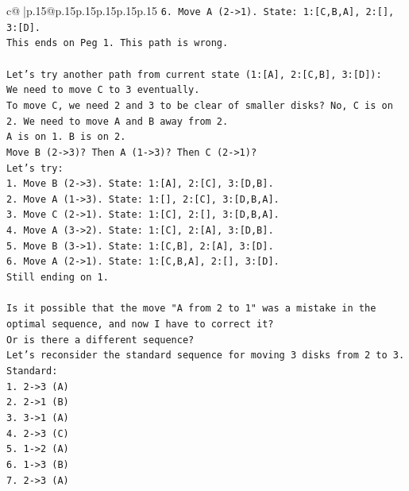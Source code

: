 \documentclass{article}
\begin{document}
{\begin{supertabular}{c@{$\;$}|p{.15\linewidth}@{}p{.15\linewidth}p{.15\linewidth}p{.15\linewidth}p{.15\linewidth}p{.15\linewidth}}
{{{\texttt{6. Move A (2{-}>1). State: 1:{[}C,B,A{]}, 2:{[}{]}, 3:{[}D{]}.} \\
\texttt{This ends on Peg 1. This path is wrong.} \\
\\ 
\texttt{Let's try another path from current state (1:{[}A{]}, 2:{[}C,B{]}, 3:{[}D{]}):} \\
\texttt{We need to move C to 3 eventually.} \\
\texttt{To move C, we need 2 and 3 to be clear of smaller disks? No, C is on 2. We need to move A and B away from 2.} \\
\texttt{A is on 1. B is on 2.} \\
\texttt{Move B (2{-}>3)? Then A (1{-}>3)? Then C (2{-}>1)?} \\
\texttt{Let's try:} \\
\texttt{1. Move B (2{-}>3). State: 1:{[}A{]}, 2:{[}C{]}, 3:{[}D,B{]}.} \\
\texttt{2. Move A (1{-}>3). State: 1:{[}{]}, 2:{[}C{]}, 3:{[}D,B,A{]}.} \\
\texttt{3. Move C (2{-}>1). State: 1:{[}C{]}, 2:{[}{]}, 3:{[}D,B,A{]}.} \\
\texttt{4. Move A (3{-}>2). State: 1:{[}C{]}, 2:{[}A{]}, 3:{[}D,B{]}.} \\
\texttt{5. Move B (3{-}>1). State: 1:{[}C,B{]}, 2:{[}A{]}, 3:{[}D{]}.} \\
\texttt{6. Move A (2{-}>1). State: 1:{[}C,B,A{]}, 2:{[}{]}, 3:{[}D{]}.} \\
\texttt{Still ending on 1.} \\
\\ 
\texttt{Is it possible that the move "A from 2 to 1" was a mistake in the optimal sequence, and now I have to correct it?} \\
\texttt{Or is there a different sequence?} \\
\texttt{Let's reconsider the standard sequence for moving 3 disks from 2 to 3.} \\
\texttt{Standard:} \\
\texttt{1. 2{-}>3 (A)} \\
\texttt{2. 2{-}>1 (B)} \\
\texttt{3. 3{-}>1 (A)} \\
\texttt{4. 2{-}>3 (C)} \\
\texttt{5. 1{-}>2 (A)} \\
\texttt{6. 1{-}>3 (B)} \\
\texttt{7. 2{-}>3 (A)} \\
\\ 
}}}
\end{supertabular}}
\end{document}
